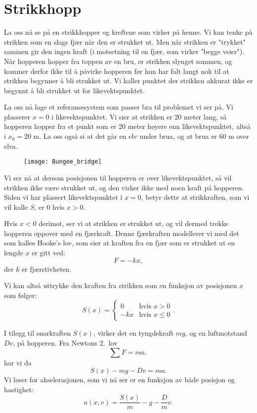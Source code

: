 \documentclass[a4paper, 11pt, notitlepage, english]{article}
\begin{document}
\clearpage

\section*{Strikkhopp}
La oss nå se på en strikkhopper og kreftene som virker på henne. Vi kan tenke på strikken som en slags fjær når den er strukket ut. Men når strikken er "trykket" sammen gir den ingen kraft (i motsetning til en fjær, som virker "begge veier"). Når hopperen hopper fra toppen av en bru, er strikken slynget sammen, og kommer derfor ikke til å påvirke hopperen før hun har falt langt nok til at strikken begynner å bli strukket ut.  Vi kaller punktet der strikken akkurat ikke er begynnt å bli strukket ut for likevektspunktet.

La oss nå lage et referansesystem som passer bra til problemet vi ser på. Vi plasserer $x=0$ i likevektspunktet. Vi sier at strikken er 20 meter lang, så hopperen hopper fra et punkt som er 20 meter høyere enn likevektspunktet, altså i $x_0 = 20$ m. La oss også si at det går en elv under brua, og at brua er 60 m over elva.

\begin{figure}[h!b]
\centering
\texttt{[image: Bungee\_bridge]}
\end{figure}

Vi ser nå at dersom posisjonen til hopperen er over likevektspunktet, så vil strikken ikke være strukket ut, og den virker ikke med noen kraft på hopperen. Siden vi har plassert likevektspunktet i $x=0$, betyr dette at strikkraften, som vi vil kalle $S$, er 0 hvis $x>0$.

Hvis $x<0$ derimot, ser vi at strikken er strukket ut, og vil dermed trekke hopperen oppover med en fjærkraft. Denne fjærkraften modellerer vi med det som kalles Hooke's lov, som sier at kraften fra en fjær som er strukket ut en lengde $x$ er gitt ved:
$$F = -kx,$$
der $k$ er fjærstivheten. 

Vi kan altså uttrykke den kraften fra strikken som en funksjon av posisjonen $x$ som følger:
$$S(x) = \begin{cases} 0 & \mbox{hvis } x>0 \\
-kx & \mbox{hvis } x \leq 0
\end{cases}.$$

I tilegg til snorkraften $S(x)$, virker det en tyngdekraft $mg$, og en luftmotstand $Dv$, på hopperen. Fra Newtons 2.\ lov
$$\sum F = ma,$$
har vi da
$$S(x) - mg - Dv = ma.$$
Vi løser for akselerasjonen, som vi nå ser er en funksjon av både posisjon og hastighet:
$$a(x,v) = \frac{S(x)}{m} - g - \frac{D}{m}v.$$
\end{document}
